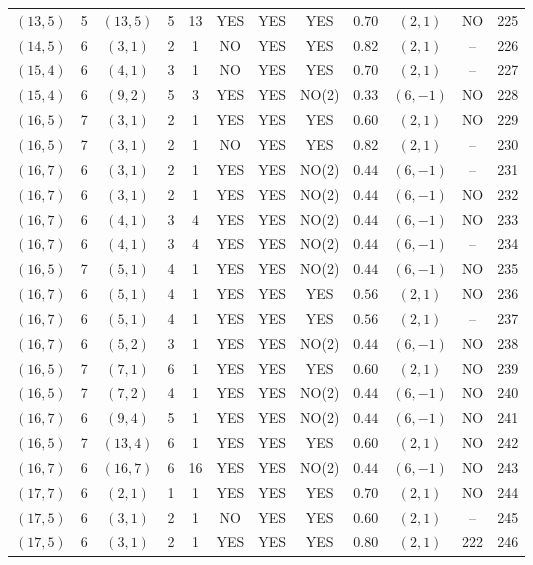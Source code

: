 \begin{longtable}{|c|c|c|c|c|c|c|c|c|c|c|c|}
$(13,5)$ & 5 & $(13,5)$ & 5 & 13 & YES & YES & YES & $0.70$ & $(2,1)$ & NO & 225\\
$(14,5)$ & 6 & $(3,1)$ & 2 & 1 & NO & YES & YES & $0.82$ & $(2,1)$ & -- & 226\\
$(15,4)$ & 6 & $(4,1)$ & 3 & 1 & NO & YES & YES & $0.70$ & $(2,1)$ & -- & 227\\
$(15,4)$ & 6 & $(9,2)$ & 5 & 3 & YES & YES & NO(2) & $0.33$ & $(6,-1)$ & NO & 228\\
$(16,5)$ & 7 & $(3,1)$ & 2 & 1 & YES & YES & YES & $0.60$ & $(2,1)$ & NO & 229\\
$(16,5)$ & 7 & $(3,1)$ & 2 & 1 & NO & YES & YES & $0.82$ & $(2,1)$ & -- & 230\\
$(16,7)$ & 6 & $(3,1)$ & 2 & 1 & YES & YES & NO(2) & $0.44$ & $(6,-1)$ & -- & 231\\
$(16,7)$ & 6 & $(3,1)$ & 2 & 1 & YES & YES & NO(2) & $0.44$ & $(6,-1)$ & NO & 232\\
$(16,7)$ & 6 & $(4,1)$ & 3 & 4 & YES & YES & NO(2) & $0.44$ & $(6,-1)$ & NO & 233\\
$(16,7)$ & 6 & $(4,1)$ & 3 & 4 & YES & YES & NO(2) & $0.44$ & $(6,-1)$ & -- & 234\\
$(16,5)$ & 7 & $(5,1)$ & 4 & 1 & YES & YES & NO(2) & $0.44$ & $(6,-1)$ & NO & 235\\
$(16,7)$ & 6 & $(5,1)$ & 4 & 1 & YES & YES & YES & $0.56$ & $(2,1)$ & NO & 236\\
$(16,7)$ & 6 & $(5,1)$ & 4 & 1 & YES & YES & YES & $0.56$ & $(2,1)$ & -- & 237\\
$(16,7)$ & 6 & $(5,2)$ & 3 & 1 & YES & YES & NO(2) & $0.44$ & $(6,-1)$ & NO & 238\\
$(16,5)$ & 7 & $(7,1)$ & 6 & 1 & YES & YES & YES & $0.60$ & $(2,1)$ & NO & 239\\
$(16,5)$ & 7 & $(7,2)$ & 4 & 1 & YES & YES & NO(2) & $0.44$ & $(6,-1)$ & NO & 240\\
$(16,7)$ & 6 & $(9,4)$ & 5 & 1 & YES & YES & NO(2) & $0.44$ & $(6,-1)$ & NO & 241\\
$(16,5)$ & 7 & $(13,4)$ & 6 & 1 & YES & YES & YES & $0.60$ & $(2,1)$ & NO & 242\\
$(16,7)$ & 6 & $(16,7)$ & 6 & 16 & YES & YES & NO(2) & $0.44$ & $(6,-1)$ & NO & 243\\
$(17,7)$ & 6 & $(2,1)$ & 1 & 1 & YES & YES & YES & $0.70$ & $(2,1)$ & NO & 244\\
$(17,5)$ & 6 & $(3,1)$ & 2 & 1 & NO & YES & YES & $0.60$ & $(2,1)$ & -- & 245\\
$(17,5)$ & 6 & $(3,1)$ & 2 & 1 & YES & YES & YES & $0.80$ & $(2,1)$ & 222 & 246\\

\end{longtable}
